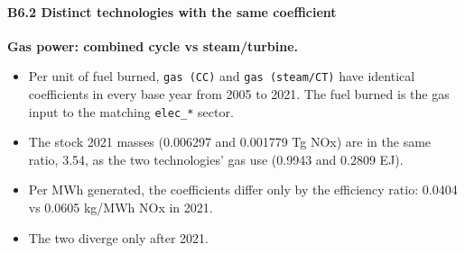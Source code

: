 \hypertarget{b6.2-distinct-technologies-with-the-same-coefficient}{%
\paragraph{B6.2
Distinct
technologies
with the
same
coefficient}\label{b6.2-distinct-technologies-with-the-same-coefficient}}

\textbf{Gas
power:
combined
cycle vs
steam/turbine.}

\begin{itemize}
\tightlist
\item
  Per unit
  of fuel
  burned,
  \texttt{gas\ (CC)}
  and
  \texttt{gas\ (steam/\allowbreak{}CT)}
  have
  identical
  coefficients
  in every
  base
  year
  from
  2005 to
  2021.
  The fuel
  burned
  is the
  gas
  input to
  the
  matching
  \texttt{elec\_\allowbreak{}*}
  sector.
\item
  The
  stock
  2021
  masses
  (0.006297
  and
  0.001779
  Tg NOx)
  are in
  the same
  ratio,
  3.54, as
  the two
  technologies'
  gas use
  (0.9943
  and
  0.2809
  EJ).
\item
  Per MWh
  generated,
  the
  coefficients
  differ
  only by
  the
  efficiency
  ratio:
  0.0404
  vs
  0.0605
  kg/MWh
  NOx in
  2021.
\item
  The two
  diverge
  only
  after
  2021.
\end{itemize}

